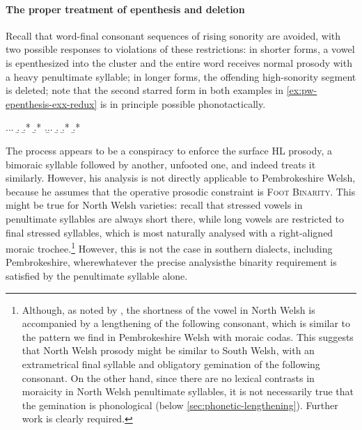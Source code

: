 \paragraph{The proper treatment of epenthesis and deletion}
\label{sec:evid-unev-troch}

Recall that word-final consonant sequences of rising sonority are avoided, with two possible responses to violations of these restrictions: in shorter forms, a vowel is epenthesized into the cluster and the entire word receives normal prosody with a heavy penultimate syllable; in longer forms, the offending high-sonority segment is deleted; note that the second starred form in both examples in \ref{ex:pw-epenthesis-exx-redux} is in principle possible phonotactically.

\ex.\label{ex:pw-epenthesis-exx-redux}\a.\a.
\b.
\b.*\mbi{[ˈpudr]}
\b.*\mbi{[ˈpuːd]}
\z.\b.\a.
\b.
\b.*\mbi{[ˈfeːnestr]}
\b.*\mbi{[feˈnester]}

The process appears to be a conspiracy to enforce the surface HL prosody, \ie a bimoraic syllable followed by another, unfooted one, and indeed \citet{hannahs09:_welsh} treats it similarly. However, his analysis is not directly applicable to Pembrokeshire Welsh, because he assumes that the operative prosodic constraint is \textsc{Foot Binarity}. This might be true for North Welsh varieties: recall that stressed vowels in penultimate syllables are always short there, while long vowels are restricted to final stressed syllables, which is most naturally analysed with a right-aligned moraic trochee.\footnote{Although, as noted by \citet{webb11:_welsh_englis}, the shortness of the vowel in North Welsh is accompanied by a lengthening of the following consonant, which is similar to the pattern we find in Pembrokeshire Welsh with moraic codas. This suggests that North Welsh prosody might be similar to South Welsh, with an extrametrical final syllable and obligatory gemination of the following consonant.  On the other hand, since there are no lexical contrasts in moraicity in North Welsh penultimate syllables, it is not necessarily true that the gemination is phonological (\cf below \cref{sec:phonetic-lengthening}). Further work is clearly required.} However, this is not the case in southern dialects, including Pembrokeshire, where\dash whatever the precise analysis\dash the binarity requirement is satisfied by the penultimate syllable alone.

